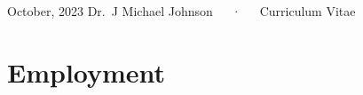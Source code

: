 \documentclass[11pt,a4paper,]{awesome-cv}
\begin{document}
\makecvheader

\makecvfooter
  {October, 2023}
    {Dr.~J Michael Johnson~~~·~~~Curriculum Vitae}
  {\thepage}





\hypertarget{employment}{%
\section{Employment}\label{employment}}
\end{document}
